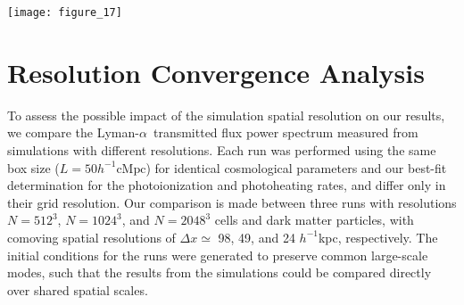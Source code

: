\documentclass[twocolumn]{aastex62}
\newcommand\Lya{Lyman-$\alpha$}
\newcommand\Sim{CHIPS~}
\begin{document}
\begin{figure*}
\texttt{[image: figure\_17]}
\caption{Power spectrum of the \Lya\ transmitted flux $P(k)$ measured from simulations
with different comoving spatial resolutions of 
$\Delta x\,\simeq$ 98, 49, and 24 $h^{-1}$kpc.
The three simulations model a $L=50h{-1}$Mpc box with the \cite{Planck_collaboration_2020} 
cosmology and apply our best-fit determination for
the photoionization and photoheating rates.
The bottom panels show the fractional difference 
in the power spectrum  $\Delta P(k) / P(k)$ between the $N=512^3$ and $N=1024^3$
runs and the $N=2048^3$ simulation. 
Low-resolution simulations show increased power on
large scales ($k \lesssim 0.03 \,\, \mathrm{ s\, km^{-1}}$) and suppressed
structure in the small scales relative to higher resolution simulations. 
For the intermediate-resolution simulation
$N=1024^3$, which corresponds to our fiducial \Sim grid resolution,
the differences in $P(k)$ with respect to
the $N=2048^3$
simulation are $\lesssim 7\%$ on the large scales 
and $\lesssim 10-25\%$ on the small scales. We account for this resolution effect
during our inference procedure by adding a systematic error 
to the observational measurements of $P(k)$ in the form of
$\sigma_\mathrm{res}= \Delta P(k,z)$, where $\Delta P(k,z)$ is the redshift- and scale-dependent 
difference in the power spectrum measured from the $N=1024^3$ run
compared with the $N=2048^3$ simulation.}  
\label{fig:resolution}
\end{figure*} 


\section{Resolution Convergence Analysis}
\label{sec:resolution}

To assess the possible impact of the simulation spatial resolution on our results,
we compare the \Lya\ transmitted flux power 
spectrum measured from simulations with different resolutions.
Each run was performed using the same box size ($L=50 h^{-1}\mathrm{cMpc}$) 
for identical cosmological parameters \citep{Planck_collaboration_2020} and our best-fit determination for the photoionization and photoheating rates,
and differ only in their grid resolution.
Our comparison is made between three runs with resolutions $N=512^3$, $N=1024^3$, 
and $N=2048^3$ cells and dark matter particles, with comoving spatial resolutions
of $\Delta x\simeq$ 98, 49, and 24 $h^{-1}$kpc, respectively. 
The initial conditions for the runs were generated to preserve common large-scale modes,
such that the results from the 
simulations could be compared directly over shared spatial scales.
\end{document}
